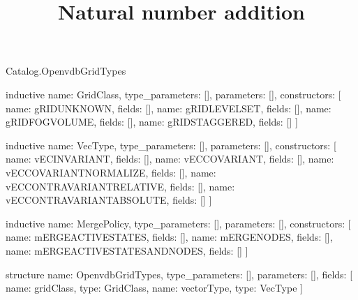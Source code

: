 \begin{lexlean}{Catalog.OpenvdbGridTypes}
\title{Natural number addition}
\begin{semanticmodule}
inductive{
  name: GridClass,
  type_parameters: [],
  parameters: [],
  constructors: [
    {name: gRIDUNKNOWN, fields: []},
    {name: gRIDLEVELSET, fields: []},
    {name: gRIDFOGVOLUME, fields: []},
    {name: gRIDSTAGGERED, fields: []}
  ]
}

inductive{
  name: VecType,
  type_parameters: [],
  parameters: [],
  constructors: [
    {name: vECINVARIANT, fields: []},
    {name: vECCOVARIANT, fields: []},
    {name: vECCOVARIANTNORMALIZE, fields: []},
    {name: vECCONTRAVARIANTRELATIVE, fields: []},
    {name: vECCONTRAVARIANTABSOLUTE, fields: []}
  ]
}

inductive{
  name: MergePolicy,
  type_parameters: [],
  parameters: [],
  constructors: [
    {name: mERGEACTIVESTATES, fields: []},
    {name: mERGENODES, fields: []},
    {name: mERGEACTIVESTATESANDNODES, fields: []}
  ]
}

structure{
  name: OpenvdbGridTypes,
  type_parameters: [],
  parameters: [],
  fields: [
    {name: gridClass, type: GridClass},
    {name: vectorType, type: VecType}
  ]
}
\end{semanticmodule}
\end{lexlean}
